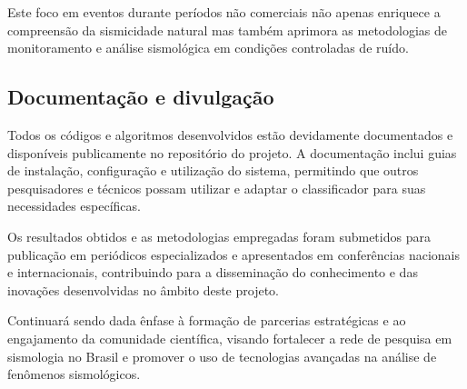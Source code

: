 \par{Este foco em eventos durante períodos não comerciais não apenas enriquece a compreensão da sismicidade natural mas também aprimora as metodologias de monitoramento e análise sismológica em condições controladas de ruído.}



\subsection{Documentação e divulgação}
\label{subsec:documentacao}
\par{Todos os códigos e algoritmos desenvolvidos estão devidamente documentados e disponíveis publicamente no repositório do projeto. A documentação inclui guias de instalação, configuração e utilização do sistema, permitindo que outros pesquisadores e técnicos possam utilizar e adaptar o classificador para suas necessidades específicas.}

\par{Os resultados obtidos e as metodologias empregadas foram submetidos para publicação em periódicos especializados e apresentados em conferências nacionais e internacionais, contribuindo para a disseminação do conhecimento e das inovações desenvolvidas no âmbito deste projeto.}

\par{Continuará sendo dada ênfase à formação de parcerias estratégicas e ao engajamento da comunidade científica, visando fortalecer a rede de pesquisa em sismologia no Brasil e promover o uso de tecnologias avançadas na análise de fenômenos sismológicos.}

